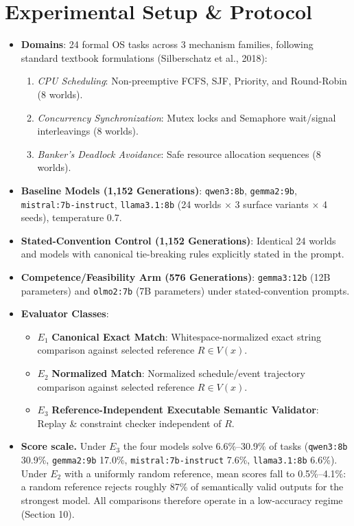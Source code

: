 \documentclass[11pt]{article}
\begin{document}
\section{Experimental Setup \& Protocol}
\begin{itemize}
\item \textbf{Domains}: 24 formal OS tasks across 3 mechanism families, following standard textbook formulations (Silberschatz et al., 2018):
\begin{enumerate}
\item \emph{CPU Scheduling}: Non-preemptive FCFS, SJF, Priority, and Round-Robin (8 worlds).
\item \emph{Concurrency Synchronization}: Mutex locks and Semaphore wait/signal interleavings (8 worlds).
\item \emph{Banker's Deadlock Avoidance}: Safe resource allocation sequences (8 worlds).
\end{enumerate}
\item \textbf{Baseline Models (1,152 Generations)}: \texttt{qwen3:8b}, \texttt{gemma2:9b}, \texttt{mistral:7b-instruct}, \texttt{llama3.1:8b} (24 worlds $\times$ 3 surface variants $\times$ 4 seeds), temperature 0.7.
\item \textbf{Stated-Convention Control (1,152 Generations)}: Identical 24 worlds and models with canonical tie-breaking rules explicitly stated in the prompt.
\item \textbf{Competence/Feasibility Arm (576 Generations)}: \texttt{gemma3:12b} (12B parameters) and \texttt{olmo2:7b} (7B parameters) under stated-convention prompts.
\item \textbf{Evaluator Classes}:
\begin{itemize}
\item $E_1$ \textbf{Canonical Exact Match}: Whitespace-normalized exact string comparison against selected reference $R \in V(x)$.
\item $E_2$ \textbf{Normalized Match}: Normalized schedule/event trajectory comparison against selected reference $R \in V(x)$.
\item $E_3$ \textbf{Reference-Independent Executable Semantic Validator}: Replay \& constraint checker independent of $R$.
\end{itemize}
\item \textbf{Score scale.} Under $E_3$ the four models solve 6.6\%--30.9\% of tasks (\texttt{qwen3:8b} 30.9\%, \texttt{gemma2:9b} 17.0\%, \texttt{mistral:7b-instruct} 7.6\%, \texttt{llama3.1:8b} 6.6\%). Under $E_2$ with a uniformly random reference, mean scores fall to 0.5\%--4.1\%: a random reference rejects roughly 87\% of semantically valid outputs for the strongest model. All comparisons therefore operate in a low-accuracy regime (Section 10).
\end{itemize}
\end{document}
